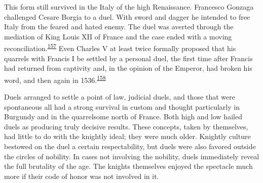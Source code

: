 This form still survived in the Italy of the high Renaissance. Francesco
Gonzaga challenged Cesare Borgia to a duel. With sword and dagger he
intended to free Italy from the feared and hated enemy. The duel was
averted through the mediation of King Louis XII of France and the case
ended with a moving
reconciliation.\textsuperscript{\protect\hypertarget{10_Chapter_Three__THE_HEROIC_DREAM.xhtmlux5cux23id_1622}{\protect\hyperlink{23_NOTES.xhtmlux5cux23id_1623}{157}}}
Even Charles V at least twice formally proposed that his quarrels with
Francis I be settled by a personal duel, the first time after Francis
had returned from captivity and, in the opinion of the Emperor, had
broken his word, and then again in
1536.\textsuperscript{\protect\hypertarget{10_Chapter_Three__THE_HEROIC_DREAM.xhtmlux5cux23id_1620}{\protect\hyperlink{23_NOTES.xhtmlux5cux23id_1621}{158}}}

Duels arranged to settle a point of law, judicial duels, and those that
were spontaneous all had a strong survival in custom and thought
particularly in Burgundy and in the quarrelsome north of France. Both
high and low hailed duels as producing truly decisive results. These
concepts, taken by themselves, had little to do with the knightly ideal;
they were much older. Knightly culture bestowed on the duel a certain
respectability, but duels were also favored outside the circles of
nobility. In cases not involving the nobility, duels immediately reveal
the full brutality of the age. The knights themselves enjoyed the
spectacle much more if their code of honor was not involved in it.

